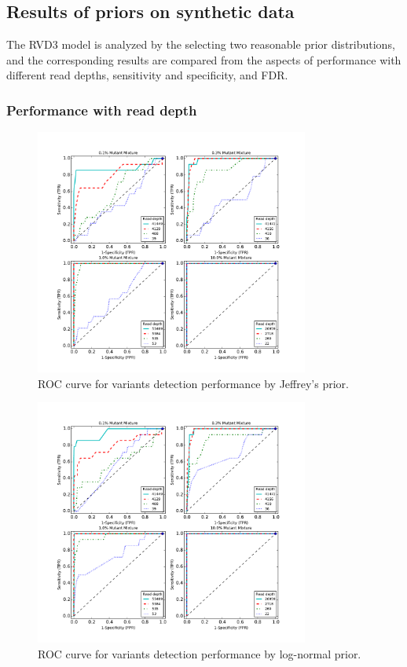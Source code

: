 \documentclass[11pt,reqno]{amsart}
\begin{document}
\subsection{Results of priors on synthetic data}
The RVD3 model is analyzed by the selecting two reasonable prior distributions, and the corresponding results are compared from the aspects of performance with different read depths, sensitivity and specificity, and FDR.

\subsubsection{Performance with read depth}

\begin{figure}[htbp]
\begin{center}
\includegraphics[width=90mm]{figs/ROC_without_chi2_jeffrey.pdf}
\caption{ROC curve for variants detection performance by Jeffrey's prior.}
\label{fig:ROC_jeffrey}
\end{center}
\end{figure}

\begin{figure}[htbp]
\begin{center}
\includegraphics[width=90mm]{figs/ROC_without_chi2_lognormal.pdf}
\caption{ROC curve for variants detection performance by log-normal prior.}
\label{fig:ROC_lognormal}
\end{center}
\end{figure}
\end{document}
